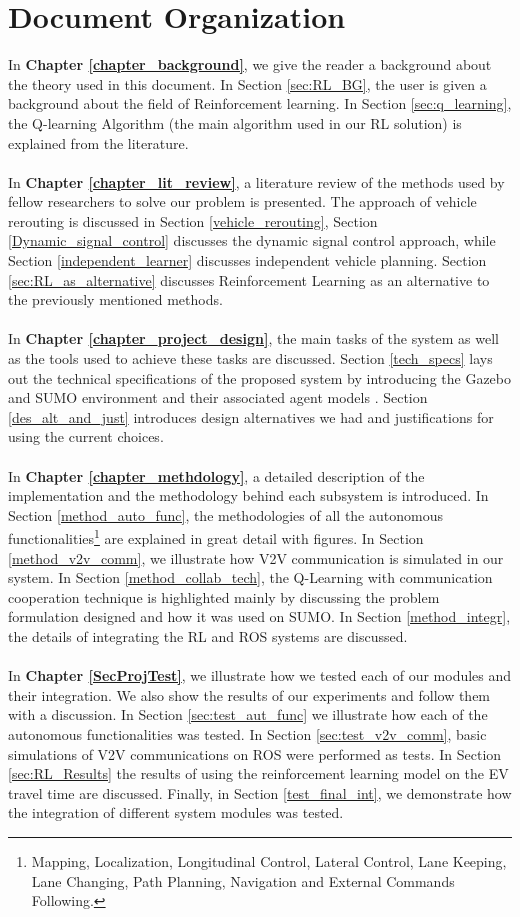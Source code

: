 \section{Document Organization}
\label{doc_org}
In\textbf{ Chapter \ref{chapter_background}}, we give the reader a background about the theory used in this document. In Section \ref{sec:RL_BG}, the user is given a background about the field of Reinforcement learning. In Section \ref{sec:q_learning}, the Q-learning Algorithm (the main algorithm used in our RL solution) is explained from the literature.
\\ \\ In \textbf{Chapter \ref{chapter_lit_review}}, a literature review of the methods used by fellow researchers to solve our problem is presented. The approach of vehicle rerouting is discussed in Section \ref{vehicle_rerouting}, Section \ref{Dynamic_signal_control} discusses the dynamic signal control approach, while Section \ref{independent_learner} discusses independent vehicle planning. Section \ref{sec:RL_as_alternative} discusses Reinforcement Learning as an alternative to the previously mentioned methods.
\\ \\ In \textbf{Chapter \ref{chapter_project_design}}, the main tasks of the system as well as the tools used to achieve these tasks are discussed. Section \ref{tech_specs} lays out the technical specifications of the proposed system by introducing the Gazebo and SUMO environment and their associated agent models . Section \ref{des_alt_and_just} introduces design alternatives we had and justifications for using the current choices.
\\ \\ In \textbf{Chapter \ref{chapter_methdology}}, a detailed description of the implementation and the methodology behind each subsystem is introduced. In Section \ref{method_auto_func}, the methodologies of all the autonomous functionalities\footnote{Mapping, Localization, Longitudinal Control, Lateral Control, Lane Keeping, Lane Changing, Path Planning, Navigation and External Commands Following.} are explained in great detail with figures. In Section \ref{method_v2v_comm}, we illustrate how V2V communication is simulated in our system. In Section \ref{method_collab_tech}, the Q-Learning with communication cooperation technique is highlighted mainly by discussing the problem formulation designed and how it was used on SUMO. In Section \ref{method_integr}, the details of integrating the RL and ROS systems are discussed.
\\ \\ In \textbf{Chapter \ref{SecProjTest}}, we illustrate how we tested each of our modules and their integration. We also show the results of our experiments and follow them with a discussion.  In Section \ref{sec:test_aut_func} we illustrate how each of the autonomous functionalities was tested. In Section \ref{sec:test_v2v_comm}, basic simulations of V2V communications on ROS were performed as tests. In Section \ref{sec:RL_Results} the results of using the reinforcement learning model on the EV travel time are discussed. Finally, in Section \ref{test_final_int}, we demonstrate how the integration of different system modules was tested. 
